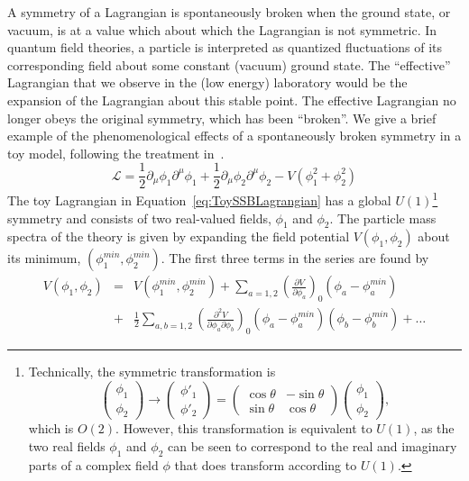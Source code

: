 A symmetry of a Lagrangian is spontaneously broken when the ground state, or
vacuum, is at a value which about which the Lagrangian is not symmetric.  In
quantum field theories, a particle is interpreted as quantized fluctuations of
its corresponding field about some constant (vacuum) ground state.  The
``effective'' Lagrangian that we observe in the (low energy) laboratory would be
the expansion of the Lagrangian about this stable point.  The effective
Lagrangian no longer obeys the original symmetry, which has been ``broken''.  We
give a brief example of the phenomenological effects of a spontaneously broken
symmetry in a toy model, following the treatment in~\cite{Morii:SMandBSM}.
\begin{equation}
  \mathcal{L} = 
  \frac{1}{2}\partial_\mu\phi_1\partial^\mu\phi_1 + 
  \frac{1}{2}\partial_\mu\phi_2\partial^\mu\phi_2 -
  V(\phi_1^2 + \phi_2^2)
  \label{eq:ToySSBLagrangian}
\end{equation}
The toy Lagrangian in Equation~\ref{eq:ToySSBLagrangian} has a global
$U(1)$\footnote{Technically, the symmetric transformation is 
\begin{equation}
  \left(\begin{array}{c} \phi_1 \\ \phi_2 \end{array}\right)
    \to
  \left(\begin{array}{c} \phi'_1 \\ \phi'_2 \end{array}\right)
    =
  \left(\begin{array}{cc} \cos\theta & -\sin\theta \\ 
    \sin\theta & \cos\theta \end{array}\right)
  \left(\begin{array}{c} \phi_1 \\ \phi_2 \end{array}\right),
    \nonumber
\end{equation} which is $O(2)$.  However, this transformation is equivalent to 
$U(1)$, as the two real fields $\phi_1$ and $\phi_2$ can be seen to correspond
to the real and imaginary parts of a complex field $\phi$ that does transform
according to $U(1)$.} symmetry and consists of two real-valued fields, $\phi_1$
and $\phi_2$.  The particle mass spectra of the theory is given by expanding the
field potential $V(\phi_1, \phi_2)$ about its minimum, $(\phi^{min}_1,
\phi^{min}_2)$.  The first three terms in the series are found by
\begin{eqnarray}
  V(\phi_1, \phi_2) &= &V(\phi^{min}_1, \phi^{min}_2) + 
  \sum_{a=1,2} \left(\frac {\partial V}{\partial \phi_a}\right)_{0} (\phi_a -
  \phi^{min}_a) \nonumber \\
  &+ &\frac{1}{2} \sum_{a,b=1,2} \left(\frac {\partial^2 V}{\partial \phi_a \partial
  \phi_b}\right)_{0} (\phi_a - \phi^{min}_a)(\phi_b - \phi^{min}_b) + \ldots
  \label{eq:ExpandedPotential}
\end{eqnarray}
